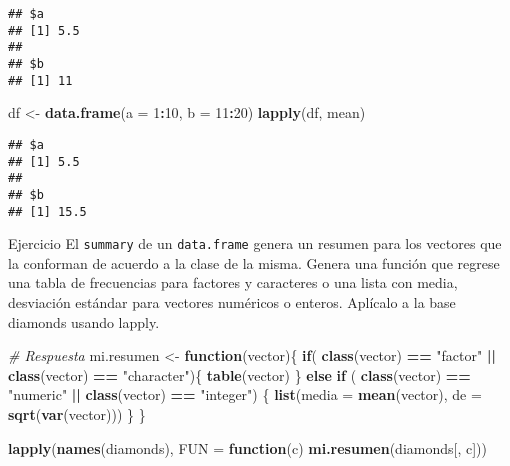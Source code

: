 \documentclass[]{article}
\newenvironment{Shaded}{\begin{snugshade}}{\end{snugshade}}
\newcommand{\KeywordTok}[1]{\textcolor[rgb]{0.13,0.29,0.53}{\textbf{#1}}}
\newcommand{\DataTypeTok}[1]{\textcolor[rgb]{0.13,0.29,0.53}{#1}}
\newcommand{\DecValTok}[1]{\textcolor[rgb]{0.00,0.00,0.81}{#1}}
\newcommand{\StringTok}[1]{\textcolor[rgb]{0.31,0.60,0.02}{#1}}
\newcommand{\CommentTok}[1]{\textcolor[rgb]{0.56,0.35,0.01}{\textit{#1}}}
\newcommand{\ControlFlowTok}[1]{\textcolor[rgb]{0.13,0.29,0.53}{\textbf{#1}}}
\newcommand{\OperatorTok}[1]{\textcolor[rgb]{0.81,0.36,0.00}{\textbf{#1}}}
\newcommand{\NormalTok}[1]{#1}
\begin{document}
\begin{verbatim}
## $a
## [1] 5.5
## 
## $b
## [1] 11
\end{verbatim}

\begin{Shaded}
\begin{Highlighting}[]
\NormalTok{df <-}\StringTok{ }\KeywordTok{data.frame}\NormalTok{(}\DataTypeTok{a =} \DecValTok{1}\OperatorTok{:}\DecValTok{10}\NormalTok{, }\DataTypeTok{b =} \DecValTok{11}\OperatorTok{:}\DecValTok{20}\NormalTok{)}
\KeywordTok{lapply}\NormalTok{(df, mean)}
\end{Highlighting}
\end{Shaded}

\begin{verbatim}
## $a
## [1] 5.5
## 
## $b
## [1] 15.5
\end{verbatim}

\renewcommand\bcStyleTitre[1]{\large\textcolor{bbblack}{#1}}

\begin{bclogo}[
  couleur=llred,
  arrondi=0,
  logo=\bcstop,
  barre=none,
  noborder=true]{Ejercicio}
El \texttt{summary} de un \texttt{data.frame} genera un resumen para los vectores que la 
conforman de acuerdo a la clase de la misma. Genera una función que regrese
una tabla de frecuencias para factores y caracteres o una lista con media, 
desviación estándar para vectores numéricos o enteros. Aplícalo a la base diamonds
usando lapply.

\end{bclogo}

\begin{Shaded}
\begin{Highlighting}[]
\CommentTok{# Respuesta}
\NormalTok{mi.resumen <-}\StringTok{ }\ControlFlowTok{function}\NormalTok{(vector)\{}
  \ControlFlowTok{if}\NormalTok{( }\KeywordTok{class}\NormalTok{(vector) }\OperatorTok{==}\StringTok{ "factor"} \OperatorTok{||}\StringTok{ }\KeywordTok{class}\NormalTok{(vector) }\OperatorTok{==}\StringTok{ "character"}\NormalTok{)\{}
    \KeywordTok{table}\NormalTok{(vector)}
\NormalTok{  \} }\ControlFlowTok{else} \ControlFlowTok{if}\NormalTok{ ( }\KeywordTok{class}\NormalTok{(vector) }\OperatorTok{==}\StringTok{ "numeric"} \OperatorTok{||}\StringTok{ }\KeywordTok{class}\NormalTok{(vector) }\OperatorTok{==}\StringTok{ "integer"}\NormalTok{) \{}
    \KeywordTok{list}\NormalTok{(}\DataTypeTok{media =} \KeywordTok{mean}\NormalTok{(vector), }\DataTypeTok{de =} \KeywordTok{sqrt}\NormalTok{(}\KeywordTok{var}\NormalTok{(vector)))}
\NormalTok{  \}}
\NormalTok{\}}

\KeywordTok{lapply}\NormalTok{(}\KeywordTok{names}\NormalTok{(diamonds), }\DataTypeTok{FUN =} \ControlFlowTok{function}\NormalTok{(c) }\KeywordTok{mi.resumen}\NormalTok{(diamonds[, c]))}
\end{Highlighting}
\end{Shaded}
\end{document}
